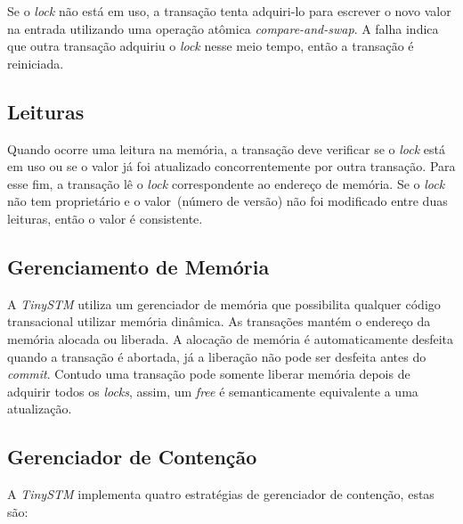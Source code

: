 \documentclass[diss,capa]{texufpel}
\begin{document}
Se o \emph{lock} não está em uso, a transação tenta adquiri-lo para escrever o novo valor na entrada utilizando uma operação atômica \emph{compare-and-swap}. A falha indica que outra transação adquiriu o \emph{lock} nesse meio tempo, então a transação é reiniciada.


\subsection{Leituras}

Quando ocorre uma leitura na memória, a transação deve verificar se o \emph{lock} está em uso ou se  o valor já foi atualizado concorrentemente por outra transação. Para esse fim, a transação lê o \emph{lock} correspondente ao endereço de memória. Se o \emph{lock} não tem proprietário e o valor~(número de versão) não foi modificado entre duas leituras, então o valor é consistente.

\subsection{Gerenciamento de Memória}

A \emph{TinySTM} utiliza um gerenciador de memória que possibilita qualquer código transacional utilizar memória dinâmica. As transações mantém o endereço da memória alocada ou liberada. A alocação de memória é automaticamente desfeita quando a transação é abortada, já a liberação não pode ser desfeita antes do \emph{commit}. Contudo uma transação pode somente liberar memória depois de adquirir todos os \emph{locks}, assim, um \emph{free} é semanticamente equivalente a uma atualização.

\subsection{Gerenciador de Contenção}

A \emph{TinySTM} implementa quatro estratégias de gerenciador de contenção, estas são:
\end{document}
